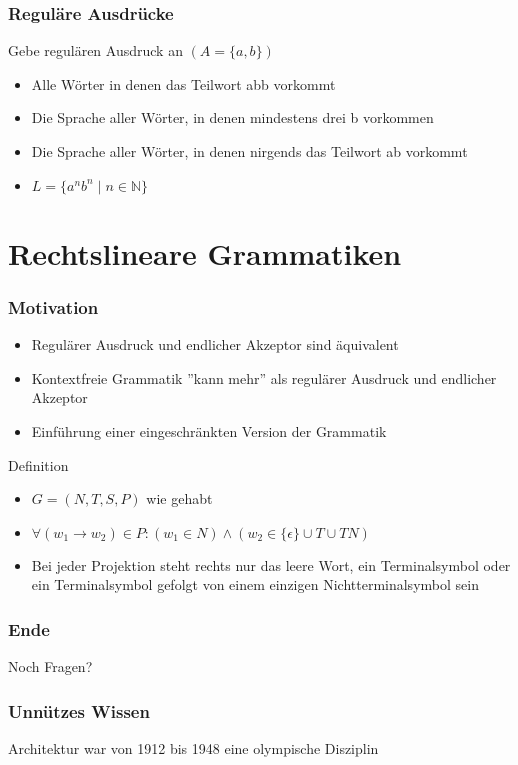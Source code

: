 \documentclass{beamer}
\begin{document}
\begin{frame}
	\frametitle{Reguläre Ausdrücke}
	\begin{block}{Gebe regulären Ausdruck an $(A = \{ a,b \})$}
		\begin{itemize}
			\item Alle Wörter in denen das Teilwort abb vorkommt
			\item Die Sprache aller Wörter, in denen mindestens drei b vorkommen
			\item Die Sprache aller Wörter, in denen nirgends das Teilwort ab vorkommt
			\item $ L = \{ a^n b^n \mid n \in \mathbb{N} \} $
		\end{itemize}
	\end{block}
\end{frame}

\section{Rechtslineare Grammatiken}
\begin{frame}
	\frametitle{Motivation}
	\begin{itemize}
		\item Regulärer Ausdruck und endlicher Akzeptor sind äquivalent
		\pause
		\item Kontextfreie Grammatik ''kann mehr'' als regulärer Ausdruck und endlicher Akzeptor
		\pause
		\item Einführung einer eingeschränkten Version der Grammatik
	\end{itemize}
\end{frame}

\begin{frame}
	\begin{block}{Definition}
		\begin{itemize}
			\item $G = ( N,T,S,P)$ wie gehabt
			\item $\forall (w_1 \rightarrow w_2) \in P : (w_1 \in N) \land (w_2 \in \{ \epsilon \} \cup T \cup TN)$
			\pause
			\item Bei jeder Projektion steht rechts nur das leere Wort, ein Terminalsymbol oder ein Terminalsymbol gefolgt von einem einzigen Nichtterminalsymbol sein
		\end{itemize}
	\end{block}
\end{frame}

\begin {frame}
\frametitle {Ende}
	\begin {center}
		Noch Fragen?
	\end {center}
\end {frame}

\begin {frame}
\frametitle {Unnützes Wissen}
	\begin {center}
		Architektur war von 1912 bis 1948 eine olympische Disziplin
	\end {center}
\end {frame}
\end{document}
